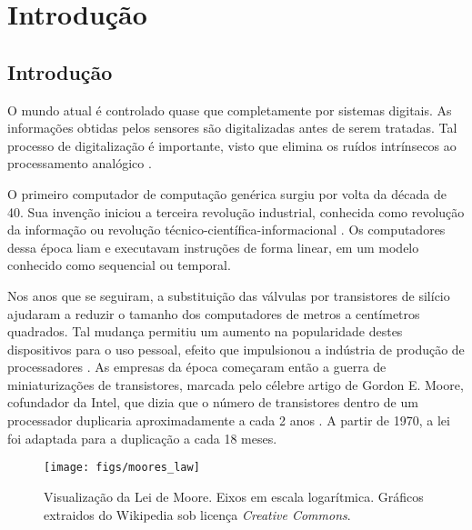 \documentclass[11pt,a4paper,oneside]{book}
\begin{document}
	\frontmatter
	\listoftodos
	\mainmatter
	
\fi

\chapter{Introdu\c{c}\~ao}\label{CapIntro}


\section{Introdu\c{c}\~ao} 
O mundo atual \'e controlado quase que completamente por sistemas digitais.
As informa\c{c}\~oes obtidas pelos sensores s\~ao digitalizadas antes de serem tratadas.
Tal processo de digitaliza\c{c}\~ao \'e importante, visto que elimina os ru\'idos intr\'insecos ao processamento anal\'ogico \cite{chen2004electrical}.

O primeiro computador de computa\c{c}\~ao gen\'erica surgiu por volta da d\'ecada de 40.
Sua inven\c{c}\~ao iniciou a terceira revolu\c{c}\~ao industrial, conhecida como revolu\c{c}\~ao da informa\c{c}\~ao ou revolu\c{c}\~ao t\'ecnico-cient\'ifica-informacional \cite{patterson2005coa}.
Os computadores dessa \'epoca liam e executavam instru\c{c}\~oes de forma linear, em um modelo conhecido como sequencial ou temporal. 

Nos anos que se seguiram, a substituição das válvulas por transistores de sil\'icio ajudaram a reduzir o tamanho dos computadores de metros a cent\'imetros quadrados.
Tal mudan\c{c}a permitiu um aumento na popularidade destes dispositivos para o uso pessoal, efeito que impulsionou a ind\'ustria de produ\c{c}\~ao de processadores \cite{Hennessy2011}.
As empresas da \'epoca come\c{c}aram ent\~ao a guerra de miniaturiza\c{c}\~oes de transistores, marcada pelo c\'elebre artigo de Gordon E. Moore, cofundador da Intel, que dizia que o n\'umero de transistores dentro de um processador duplicaria aproximadamente a cada 2 anos \cite{Moore1965}.
A partir de 1970, a lei foi adaptada para a duplica\c{c}\~ao a cada 18 meses.

\begin{figure}[h]
	\centering
	\texttt{[image: figs/moores\_law]}
	\caption{Visualização da Lei de Moore. Eixos em escala logarítmica. Gráficos extraidos do Wikipedia sob licença \textit{Creative Commons}.}
	\label{fig:moores_law}
\end{figure}
\end{document}
